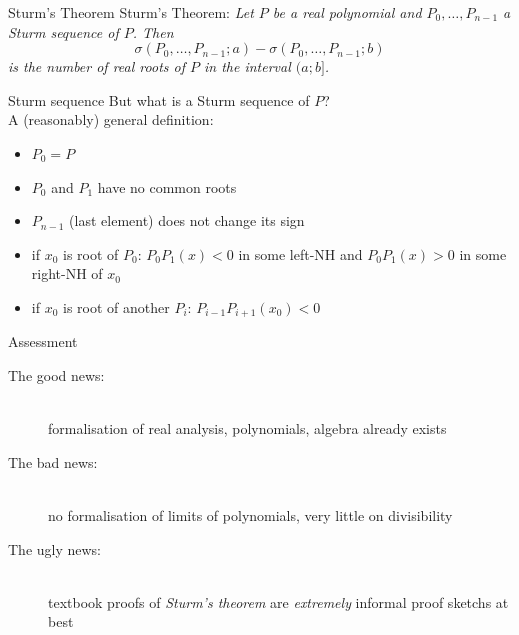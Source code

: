 \documentclass[%
	sans,			%
	mathsans,		%
	10pt,
	t		%
	slidescentered,%
]{beamer}
\begin{document}
\begin{frame}{Sturm's Theorem}
Sturm's Theorem: \textit{Let $P$ be a real polynomial and $P_0, \ldots, P_{n-1}$ a Sturm sequence of $P$. Then
$$\sigma(P_0, \ldots, P_{n-1}; a) - \sigma(P_0, \ldots, P_{n-1}; b)$$
is the number of real roots of $P$ in the interval $(a; b]$.}
\end{frame}

\begin{frame}{Sturm sequence}
But what is a Sturm sequence of $P$?\\
A (reasonably) general definition:\\
\begin{itemize}
\item $P_0 = P$\pause
\item $P_0$ and $P_1$ have no common roots\pause
\item $P_{n-1}$ (last element) does not change its sign\pause
\item if $x_0$ is root of $P_0$: $P_0P_1(x)<0$ in some left-NH and $P_0P_1(x)>0$ in some right-NH of $x_0$\pause
\item if $x_0$ is root of another $P_i$: $P_{i-1}P_{i+1}(x_0) < 0$
\end{itemize}
\end{frame}

\begin{frame}{Assessment}
\begin{description}
\item[The good news:]\ \\formalisation of real analysis, polynomials, algebra already exists
\pause\item[The bad news:]\ \\no formalisation of limits of polynomials, very little on divisibility
\pause\item[The ugly news:]\ \\textbook proofs of \emph{Sturm's theorem} are \emph{extremely} informal proof sketchs at best
\end{description}
\end{frame}
\end{document}
